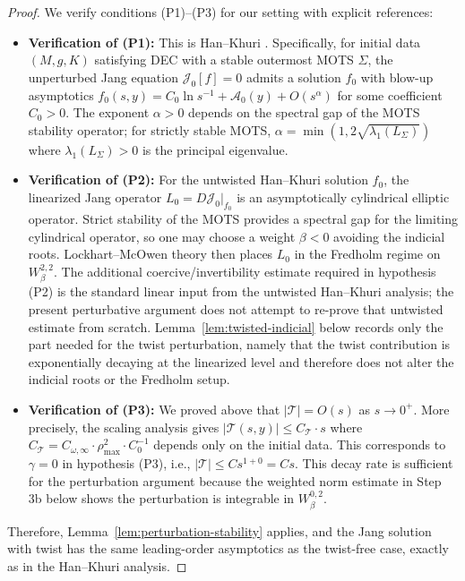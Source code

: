 \begin{proof}
We verify conditions (P1)--(P3) for our setting with explicit references:
\begin{itemize}
    \item \textbf{Verification of (P1):} This is Han--Khuri \cite[Proposition 4.5]{hankhuri2013}. Specifically, for initial data $(M,g,K)$ satisfying DEC with a stable outermost MOTS $\Sigma$, the unperturbed Jang equation $\mathcal{J}_0[f] = 0$ admits a solution $f_0$ with blow-up asymptotics $f_0(s,y) = C_0 \ln s^{-1} + \mathcal{A}_0(y) + O(s^\alpha)$ for some coefficient $C_0>0$. The exponent $\alpha > 0$ depends on the spectral gap of the MOTS stability operator; for strictly stable MOTS, $\alpha = \min(1, 2\sqrt{\lambda_1(L_\Sigma)})$ where $\lambda_1(L_\Sigma) > 0$ is the principal eigenvalue.
    
    \item \textbf{Verification of (P2):} For the untwisted Han--Khuri solution $f_0$, the linearized Jang operator $L_0=D\mathcal{J}_0|_{f_0}$ is an asymptotically cylindrical elliptic operator. Strict stability of the MOTS provides a spectral gap for the limiting cylindrical operator, so one may choose a weight $\beta<0$ avoiding the indicial roots. Lockhart--McOwen theory \cite{lockhartmccowen1985} then places $L_0$ in the Fredholm regime on $W^{2,2}_\beta$. The additional coercive/invertibility estimate required in hypothesis (P2) is the standard linear input from the untwisted Han--Khuri analysis; the present perturbative argument does not attempt to re-prove that untwisted estimate from scratch. Lemma~\ref{lem:twisted-indicial} below records only the part needed for the twist perturbation, namely that the twist contribution is exponentially decaying at the linearized level and therefore does not alter the indicial roots or the Fredholm setup.
    
    \item \textbf{Verification of (P3):} We proved above that $|\mathcal{T}| = O(s)$ as $s \to 0^+$. More precisely, the scaling analysis gives $|\mathcal{T}(s,y)| \leq C_\mathcal{T} \cdot s$ where $C_\mathcal{T} = C_{\omega,\infty} \cdot \rho_{\max}^2 \cdot C_0^{-1}$ depends only on the initial data. This corresponds to $\gamma = 0$ in hypothesis (P3), i.e., $|\mathcal{T}| \leq Cs^{1+0} = Cs$. This decay rate is sufficient for the perturbation argument because the weighted norm estimate in Step 3b below shows the perturbation is integrable in $W^{0,2}_\beta$.
\end{itemize}

Therefore, Lemma~\ref{lem:perturbation-stability} applies, and the Jang solution with twist has the same leading-order asymptotics as the twist-free case, exactly as in the Han--Khuri analysis.


\end{proof}
